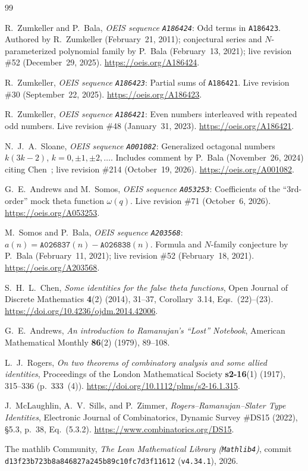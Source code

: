 \documentclass[11pt]{article}
\theoremstyle{definition}
\newcommand{\seq}[1]{\texttt{#1}}
\begin{document}
{\small
\begin{thebibliography}{99}\setlength{\itemsep}{2pt}
\raggedright

R.\ Zumkeller and P.\ Bala, \emph{OEIS sequence \seq{A186424}}: Odd terms in \seq{A186423}. Authored by R.\ Zumkeller (February~21, 2011); conjectural series and $N$-parameterized polynomial family by P.\ Bala (February~13, 2021); live revision \#52 (December~29, 2025). \url{https://oeis.org/A186424}.

R.\ Zumkeller, \emph{OEIS sequence \seq{A186423}}: Partial sums of \seq{A186421}. Live revision \#30 (September~22, 2025). \url{https://oeis.org/A186423}.

R.\ Zumkeller, \emph{OEIS sequence \seq{A186421}}: Even numbers interleaved with repeated odd numbers. Live revision \#48 (January~31, 2023). \url{https://oeis.org/A186421}.

N.~J.~A.\ Sloane, \emph{OEIS sequence \seq{A001082}}: Generalized octagonal numbers $k(3k - 2)$, $k = 0, \pm 1, \pm 2, \dots$. Includes comment by P.\ Bala (November~26, 2024) citing Chen~\cite{chen2014}; live revision \#214 (October~19, 2026). \url{https://oeis.org/A001082}.

G.~E.\ Andrews and M.\ Somos, \emph{OEIS sequence \seq{A053253}}: Coefficients of the ``3rd-order'' mock theta function $\omega(q)$. Live revision \#71 (October~6, 2026). \url{https://oeis.org/A053253}.

M.\ Somos and P.\ Bala, \emph{OEIS sequence \seq{A203568}}: $a(n) = \seq{A026837}(n) - \seq{A026838}(n)$. Formula and $N$-family conjecture by P.\ Bala (February~11, 2021); live revision \#52 (February~18, 2021). \url{https://oeis.org/A203568}.

S.~H.~L.\ Chen, \emph{Some identities for the false theta functions}, Open Journal of Discrete Mathematics \textbf{4}(2) (2014), 31--37, Corollary~3.14, Eqs.~(22)--(23). \url{https://doi.org/10.4236/ojdm.2014.42006}.

G.~E.\ Andrews, \emph{An introduction to Ramanujan's ``Lost'' Notebook}, American Mathematical Monthly \textbf{86}(2) (1979), 89--108.

L.~J.\ Rogers, \emph{On two theorems of combinatory analysis and some allied identities}, Proceedings of the London Mathematical Society \textbf{s2-16}(1) (1917), 315--336 (p.~333~(4)). \url{https://doi.org/10.1112/plms/s2-16.1.315}.

J.\ McLaughlin, A.~V.\ Sills, and P.\ Zimmer, \emph{Rogers--Ramanujan--Slater Type Identities}, Electronic Journal of Combinatorics, Dynamic Survey \#DS15 (2022), \S5.3, p.~38, Eq.~(5.3.2). \url{https://www.combinatorics.org/DS15}.

The mathlib Community, \emph{The Lean Mathematical Library (\texttt{Mathlib4})}, commit \texttt{d13f23b723b8a846827a245b89c10fc7d3f11612} (\texttt{v4.34.1}), 2026.

\end{thebibliography}
}
\end{document}
